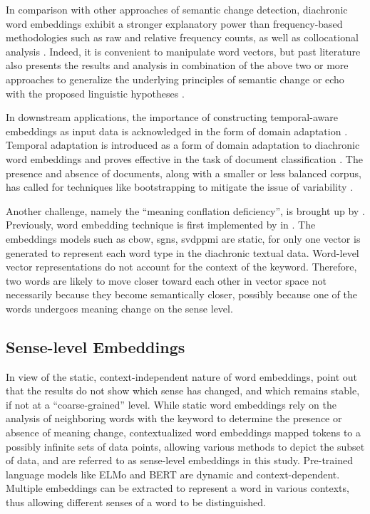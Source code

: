 In comparison with other approaches of semantic change detection, diachronic word embeddings exhibit a stronger explanatory power than frequency-based methodologies such as raw and relative frequency counts, as well as collocational analysis \parencite{kutuzov2018survey}. Indeed, it is convenient to manipulate word vectors, but past literature also presents the results and analysis in combination of the above two or more approaches to generalize the underlying principles of semantic change or echo with the proposed linguistic hypotheses \parencite{tahmasebi2018survey}.

In downstream applications, the importance of constructing temporal-aware embeddings as input data is acknowledged in the form of domain adaptation \parencite{huang2019neural}. Temporal adaptation is introduced as a form of domain adaptation to diachronic word embeddings and proves effective in the task of document classification \parencite{huang2019neural}. The presence and absence of documents, along with a smaller or less balanced corpus, has called for techniques like bootstrapping to mitigate the issue of variability \parencite{antoniak2018evaluating}.

Another challenge, namely the ``meaning conflation deficiency'', is brought up by \textcite{camacho2018survey}. Previously, word embedding technique is first implemented by \citeauthor{mikolov2013efficient} in \citeyear{mikolov2013efficient}. The embeddings models such as \gls{cbow}, \gls{sgns}, \gls{svdppmi} are static, for only one vector is generated to represent each word type in the diachronic textual data. Word-level vector representations do not account for the context of the keyword. Therefore, two words are likely to move closer toward each other in vector space not necessarily because they become semantically closer, possibly because one of the words undergoes meaning change on the sense level.

\subsection{Sense-level Embeddings}
In view of the static, context-independent nature of word embeddings, \textcite{hu2019diachronic} point out that the results do not show which sense has changed, and which remains stable, if not at a ``coarse-grained'' level. While static word embeddings rely on the analysis of neighboring words with the keyword to determine the presence or absence of meaning change, contextualized word embeddings mapped tokens to a possibly infinite sets of data points, allowing various methods to depict the subset of data, and are referred to as sense-level embeddings in this study. Pre-trained language models like ELMo and BERT are dynamic and context-dependent. Multiple embeddings can be extracted to represent a word in various contexts, thus allowing different senses of a word to be distinguished.

